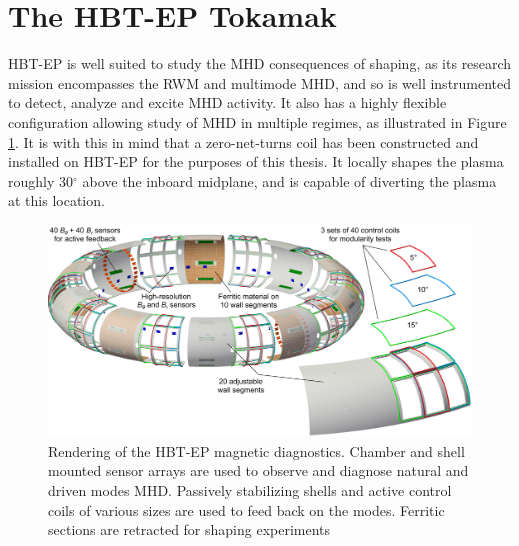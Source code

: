 \documentclass[aps,prl,twocolumn,superscriptaddress,groupedaddress]{revtex4}  %
\begin{document}

\section{The HBT-EP Tokamak}
	HBT-EP is well suited to study the MHD consequences of shaping, as its research mission encompasses the RWM and multimode MHD, and so is well instrumented to detect, analyze and excite MHD activity.  It also has a highly flexible configuration allowing study of MHD in multiple regimes, as illustrated in Figure \ref{schematic}. It is with this in mind that a zero-net-turns coil has been constructed and installed on HBT-EP for the purposes of this thesis.  It locally shapes the plasma roughly 30${^\circ}$ above the inboard midplane, and is capable of diverting the plasma at this location.
	\begin{figure}[htb]
	\centering
	\includegraphics[scale=.25]{../Plots/Plasma_with_sensors_FWall_concept_WithCCview.png}
	\caption{Rendering of the HBT-EP magnetic diagnostics.  Chamber and shell mounted sensor arrays are used to observe and diagnose natural and driven modes MHD.  Passively stabilizing shells and active control coils of various sizes are used to feed back on the modes.  Ferritic sections are retracted for shaping experiments}
	\label{schematic}
	\end{figure}
	
\end{document}
